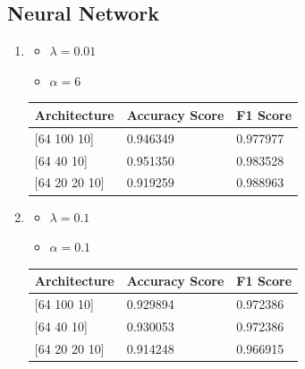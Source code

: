 \documentclass[letterpaper]{article}
\begin{document}
\subsection*{Neural Network}
\begin{enumerate}[label=(\alph*)]
	\item \begin{itemize}
		      \item $\lambda = 0.01$
		      \item $\alpha = 6$
	      \end{itemize}

	      \begin{table}[H]
		      \centering
		      \begin{tabular}{|l|l|l|}
			      \hline
			      Architecture      & Accuracy Score & F1 Score \\ \hline
			      {[}64 100 10{]}   & 0.946349       & 0.977977 \\ \hline
			      {[}64 40 10{]}    & 0.951350       & 0.983528 \\ \hline
			      {[}64 20 20 10{]} & 0.919259       & 0.988963 \\ \hline
		      \end{tabular}
	      \end{table}
	\item \begin{itemize}
		      \item $\lambda = 0.1$
		      \item $\alpha = 0.1$
	      \end{itemize}

	      \begin{table}[H]
		      \centering
		      \begin{tabular}{|l|l|l|}
			      \hline
			      Architecture      & Accuracy Score & F1 Score \\ \hline
			      {[}64 100 10{]}   & 0.929894       & 0.972386 \\ \hline
			      {[}64 40 10{]}    & 0.930053       & 0.972386 \\ \hline
			      {[}64 20 20 10{]} & 0.914248       & 0.966915 \\ \hline
		      \end{tabular}
	      \end{table}
\end{enumerate}
\end{document}

